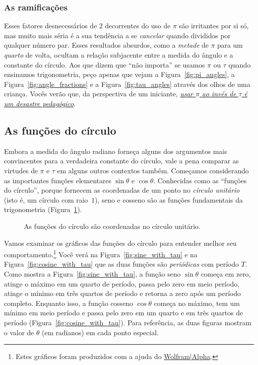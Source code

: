 {    \subsubsection{As ramificações} %
    \label{sec:the_ramifications}


Esses fatores desnecessários de $2$ decorrentes do uso de $\pi$ são irritantes por si só, mas muito mais séria é a sua tendência a se \emph{cancelar} quando divididos por qualquer número par. Esses resultados absurdos, como a \emph{metade} de $\pi$ para um \emph{quarto} de volta, ocultam a relação subjacente entre a medida do ângulo e a constante do círculo. Aos que dizem que ``não importa'' se usamos $\pi$ ou $\tau$ quando ensinamos trigonometria, peço apenas que vejam a Figura~\ref{fig:pi_angles}, a Figura~\ref{fig:angle_fractions} e a Figura~\ref{fig:tau_angles} através dos olhos de uma criança. Vocês verão que, da perspectiva de um iniciante, \href{https://tauday.com/a-tau-testimonial}{\emph{usar $\pi$ ao invés de $\tau$ é um desastre pedagógico}}.

  \subsection{As funções do círculo} %
  \label{sec:the_circle_functions}

Embora a medida do ângulo radiano forneça alguns dos argumentos mais convincentes para a verdadeira constante do círculo, vale a pena comparar as virtudes de $\pi$ e $\tau$ em alguns outros contextos também. Começamos considerando as importantes funções elementares $\sin\theta$ e $\cos\theta$. Conhecidas como as ``funções do círculo'', porque fornecem as coordenadas de um ponto no \emph{círculo unitário} (isto é, um círculo com raio~$1$), seno e cosseno são as funções fundamentais da trigonometria (Figura~\ref{fig:circle_functions}).

\begin{figure}
\begin{center}
\end{center}
\caption{As funções do círculo são coordenadas no círculo unitário.\label{fig:circle_functions}}
\end{figure}

Vamos examinar os gráficos das funções do círculo para entender melhor seu comportamento.\footnote{Estes gráficos foram produzidos com a ajuda do \href{https://www.wolframalpha.com/}{Wolfram|Alpha}.} Você verá na Figura~\ref{fig:sine_with_tau} e na Figura~\ref{fig:cosine_with_tau} que as duas funções são \emph{periódicas} com período $T$. Como mostra a Figura~\ref{fig:sine_with_tau}, a função seno $\sin\theta$ começa em zero, atinge o máximo em um quarto de período, passa pelo zero em meio período, atinge o mínimo em três quartos de período e retorna a zero após um período completo. Enquanto isso, a função cosseno $\cos\theta$ começa no máximo, tem um mínimo em meio período e passa pelo zero em um quarto e em três quartos de período (Figura~\ref{fig:cosine_with_tau}). Para referência, as duas figuras mostram o valor de $\theta$ (em radianos) em cada ponto especial.

}
